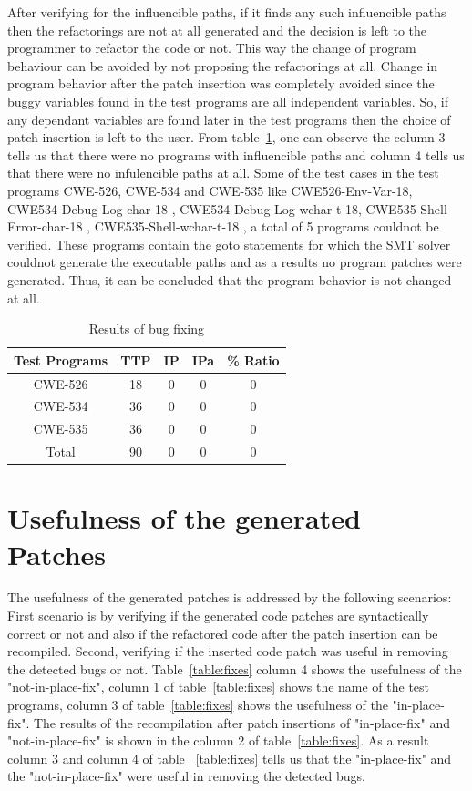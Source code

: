 After verifying for the influencible paths, if it finds any such
influencible paths then the refactorings are not at all generated and
the decision is left to the programmer to refactor the code 
or not. This way the change of program behaviour can be avoided by not
proposing the refactorings at all. Change in program behavior after the 
patch insertion was completely avoided since the buggy variables found in the
test programs are all independent variables. So, if any dependant variables are
found later in the test programs then the choice of patch insertion is left to the 
user. From table~\ref{table:behavior}, one can observe the column 3 tells us
that there were no programs with influencible paths and column 4 tells us
that there were no infulencible paths at all.
Some of the test cases in the test programs CWE-526, CWE-534 and CWE-535 like
CWE526-Env-Var-18, CWE534-Debug-Log-char-18
, CWE534-Debug-Log-wchar-t-18, CWE535-Shell-Error-char-18
, CWE535-Shell-wchar-t-18 , a total of 5 programs
couldnot be verified. These programs contain the goto statements for which the 
SMT solver couldnot generate the executable paths and as a results no program
patches were generated. Thus, it can be concluded that
the program behavior is not changed at all.

\begin{table}[h!]
\centering
 \begin{tabular}{||c |c |c |c |c||} 
 \hline
\textbf{Test Programs} & \textbf{TTP} & \textbf{IP} & \textbf{IPa} & \textbf{\% Ratio}\\ [0.5ex] 
 \hline\hline
 CWE-526&18 &0 & 0& 0\\
 \hline
 CWE-534&36 &0 &0 &0 \\
 \hline
 CWE-535&36 &0 & 0 & 0\\
 \hline
 Total&90&0&0&0\\
  \hline\hline
\end{tabular}
\caption{Results of bug fixing}
\label{table:behavior}
\end{table}


\section{Usefulness of the generated Patches}
The usefulness of the generated patches is addressed by the following scenarios:
First scenario is by verifying if the generated code patches are syntactically
correct or not and also if the refactored code after the patch insertion can be
recompiled. Second, verifying if the inserted code patch was useful in removing
the detected bugs or not. Table~\ref{table:fixes} column 4 shows the usefulness
of the "not-in-place-fix", column 1 of table~\ref{table:fixes} shows 
the name of the test programs, column 3 of table~\ref{table:fixes} shows
the usefulness of the "in-place-fix". The results of the recompilation after
patch insertions of "in-place-fix" and "not-in-place-fix" is shown in the
column 2 of table~\ref{table:fixes}. As a result column 3 and column 4 of table
~\ref{table:fixes} tells us that the "in-place-fix" and the  "not-in-place-fix"
were useful in removing the detected bugs.


